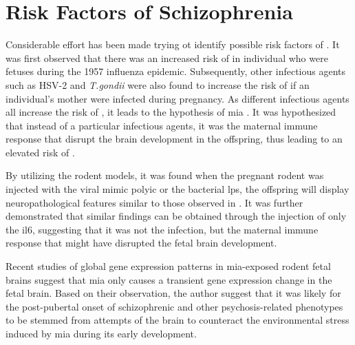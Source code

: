 \documentclass[12pt]{book}
\newcommand*{\glng}{\glsentrylong}
\begin{document}
	\section{Risk Factors of Schizophrenia}
	Considerable effort has been made trying ot identify possible risk factors of \glng{scz}. 
	It was first observed that there was an increased risk of \glng{scz} in individual who were fetuses during the 1957 influenza epidemic\citep{Mednick1958}. 
	Subsequently, other infectious agents such as HSV-2 and \textit{T.gondii} were also found to increase the risk of \glng{scz} if an individual's mother were infected during pregnancy.
	As different infectious agents all increase the risk of \glng{scz}, it leads to the hypothesis of \gls{mia} \citep{Brown2010}.
	It was hypothesized that instead of a particular infectious agents, it was the maternal immune response that disrupt the brain development in the offspring, thus leading to an elevated risk of \glng{scz}.
		
	By utilizing the rodent models, it was found when the pregnant rodent was injected with the viral mimic \gls{polyic} or the bacterial \gls{lps}, the offspring will display neuropathological features similar to those observed in \glng{scz}\citep{Meyer2009b}.
	It was further demonstrated that similar findings can be obtained through the injection of only the \gls{il6}\citep{Smith2007}, suggesting that it was not the infection, but the maternal immune response that might have disrupted the fetal brain development.
	
	
	Recent studies of global gene expression patterns in \gls{mia}-exposed rodent fetal brains \citep{Garbett2012a} suggest that \gls{mia} only causes a transient gene expression change in the fetal brain.
	Based on their observation, the author suggest that it was likely for the post-pubertal onset of schizophrenic and other psychosis-related phenotypes to be stemmed from attempts of the brain to counteract the environmental stress induced by \gls{mia} during its early development\citep{Garbett2012a}. 
	
\end{document}
